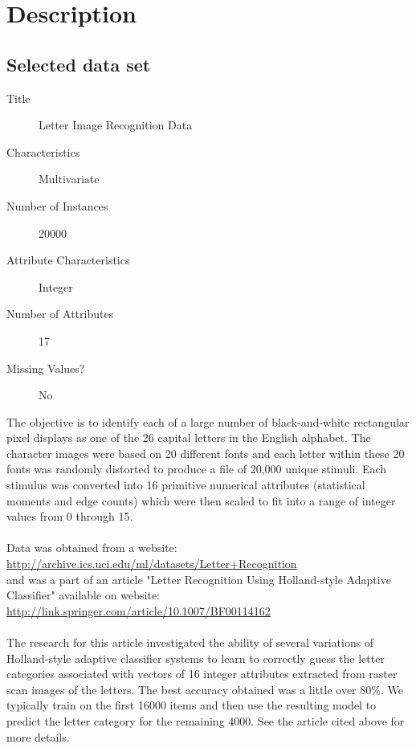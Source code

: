 \chapter*{Description}
\section*{Selected data set}
\begin{description}
\item[Title] Letter Image Recognition Data
\item[Characteristics]  Multivariate
\item[Number of Instances] 20000
\item[Attribute Characteristics] Integer
\item[Number of Attributes] 17
\item[Missing Values?] No
\end{description}

The objective is to identify each of a large number of black-and-white rectangular
pixel displays as one of the 26 capital letters in the English alphabet. The
character images were based on 20 different fonts and each letter within these
20 fonts was randomly distorted to produce a file of 20,000 unique stimuli.
Each stimulus was converted into 16 primitive numerical attributes (statistical
moments and edge counts) which were then scaled to fit into a range of integer
values from 0 through 15. \\
\\
\noindent
Data was obtained from a website: \\
\url{http://archive.ics.uci.edu/ml/datasets/Letter+Recognition} \\
and was a part of an article "Letter Recognition Using Holland-style Adaptive
Classifier" available on website: \\
\url{http://link.springer.com/article/10.1007/BF00114162} \\
\\
\noindent
The research for this article investigated the ability of several
variations of Holland-style adaptive classifier systems to learn to
correctly guess the letter categories associated with vectors of 16
integer attributes extracted from raster scan images of the letters.
The best accuracy obtained was a little over 80\%.
We typically train on the first 16000 items and then use the resulting model
to predict the letter category for the remaining 4000. See the article cited
above for more details.

